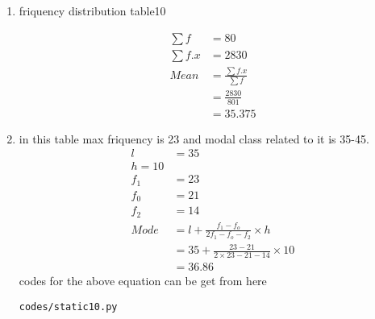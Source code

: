 \renewcommand{\theequation}{\theenumi}
\begin{enumerate}[label=\arabic*.,ref=\thesubsection.\theenumi]
\item \begin{table}[!ht]
	\centering
	
	\caption{friquency distribution table10 }
\end{table}
\begin{align}
\sum{f} &= 80
\\
\sum{f.x} &= 2830
\\
Mean &= \frac{\sum{f.x}}{\sum{f}}
\\ &= \frac{2830}{801}
\\&= 35.375
\end{align}
\item in this table max friquency is 23 and modal class related to it is 35-45.
\\
\begin{align}
l &= 35
\\
h = 10
\\
f_1 &= 23
\\
f_0 &= 21
\\
f_2 &= 14
\\
Mode &= l+\frac{f_1 - f_o}{2f_1 - f_o - f_2}\times h
\\
&= 35+\frac{23 - 21}{2\times 23 - 21- 14}\times 10
\\
&=36.86
\end{align}
codes for the above equation can be get from here
\begin{lstlisting}
codes/static10.py
\end{lstlisting}
\end{enumerate}